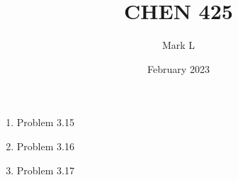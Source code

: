 \documentclass[12pt]{article}
\title{CHEN 425}
\author{Mark L}
\date{February 2023}
\begin{document}

\begin{enumerate}

\newpage
    \item Problem 3.15
    
\newpage
    \item Problem 3.16

\newpage
    \item Problem 3.17


\end{enumerate}
\end{document}
